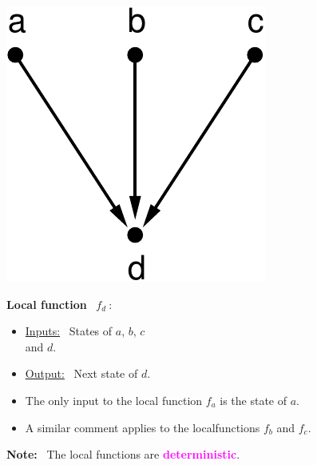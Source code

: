 \documentclass[landscape,a0paper,fontscale=0.285]{baposter} %
\newcommand{\compresslist}{ %
\setlength{\itemsep}{1pt}
\setlength{\parskip}{0pt}
\setlength{\parsep}{0pt}
}
\begin{document}
\begin{poster}
{\begin{minipage}{0.25\textwidth}
\begin{center}
\includegraphics[scale=0.35]{local_function.pdf}
\end{center}
\end{minipage}
\hspace*{0.2in}
\begin{minipage}{0.6\textwidth}
\textbf{Local function}~ $f_d\:$:


\begin{itemize}[leftmargin=*,noitemsep,topsep=0pt]\compresslist
\item \underline{Inputs:}~
States of $a$, $b$, $c$\\ and $d$.  
\item \underline{Output:}~ Next state of $d$.
\end{itemize}
\end{minipage}

\medskip

\begin{itemize}[leftmargin=*,noitemsep,topsep=0pt]\compresslist
\item The only input to the local function $f_a$ is\newline
the state of $a$. %
\item A similar comment applies to the local\newline functions
$f_b$ and $f_c$.
\end{itemize}

\medskip

\noindent
\textbf{Note:}~ The local functions are 
\textcolor{magenta}{\textbf{deterministic}}.
}


\end{poster}
\end{document}
